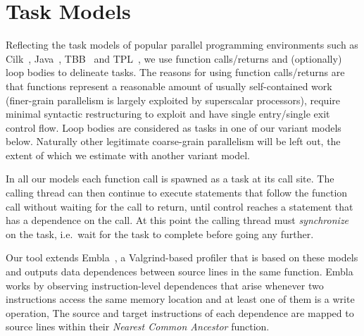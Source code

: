 \section{Task Models} \label{smethod}

Reflecting the task models of popular parallel programming environments such as Cilk~\cite{blumofe96cilk},
Java~\cite{lea00java}, TBB~\cite{reinders07intel} and TPL~\cite{leijen07parallel},
we use function calls/returns and (optionally) loop bodies to delineate tasks.
The reasons for using function calls/returns are that functions represent a reasonable amount of usually self-contained work (finer-grain parallelism is largely exploited by superscalar processors), require minimal syntactic restructuring to exploit and have single entry/single exit control flow.
Loop bodies are considered as tasks in one of our variant models below.
Naturally other legitimate coarse-grain parallelism will be left out,
the extent of which we estimate with another variant model.

In all our models each function call is spawned as a task at its call site.
The calling thread can then continue to execute statements that follow the function call without waiting for the call to return,
until control reaches a statement that has a dependence on the call.
At this point the calling thread must \emph{synchronize} on the task,
i.e.\ wait for the task to complete before going any further.

Our tool extends Embla~\cite{embla:08}, a Valgrind-based profiler that is based
on these models and outputs data dependences between source lines in the same
function. Embla works by observing instruction-level dependences that arise
whenever two instructions access the same memory location and at least one of
them is a write operation, The source and target instructions of each
dependence are mapped to source lines within their {\em Nearest Common
Ancestor} function.

